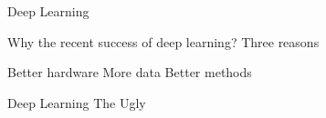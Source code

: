 


\begin{slide}{Deep Learning}
  \begin{itemize}
    \pitem Why the recent success of deep learning? %
    \pitem Three reasons
    \begin{enumerate}
      \pitem Better hardware
      \pitem More data
      \pitem Better methods
    \end{enumerate}
  \end{itemize}
\end{slide}

\begin{slide}{Deep Learning}
  {
    \Huge
    The Ugly
  }
\end{slide}
